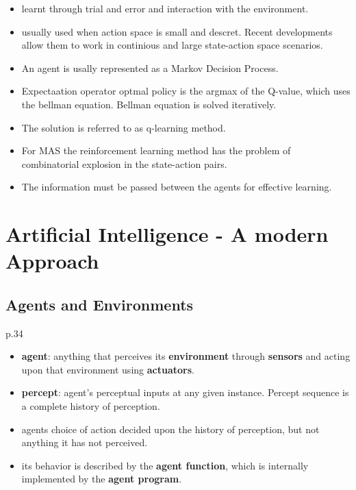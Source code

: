 \begin{itemize}
\begin{itemize}[noitemsep,nolistsep]
		\item learnt through trial and error and interaction with the environment.
		\item usually used when action space is small and descret. Recent developments allow them to work in continious and large state-action space scenarios.
		\item An agent is usally represented as a Markov Decision Process.
		\item Expectaation operator optmal policy is the argmax of the Q-value, which uses the bellman equation. Bellman equation is solved iteratively.
		\item The solution is referred to as q-learning method.
		\item For MAS the reinforcement learning method has the problem of combinatorial explosion in the state-action pairs.
		\item The information must be passed between the agents for effective learning.
	\end{itemize}
\end{itemize}

\section{Artificial Intelligence - A modern Approach}
\subsection{Agents and Environments}
p.34
\begin{itemize}[noitemsep,nolistsep]
	\item \textbf{agent}: anything that perceives its \textbf{environment} through \textbf{sensors} and acting upon that environment using \textbf{actuators}.
	\item \textbf{percept}: agent’s perceptual inputs at any given instance. Percept sequence is a complete history of perception.
	\item agents choice of action decided upon the history of perception, but not anything it has not perceived.
	\item its behavior is described by the \textbf{agent function}, which is internally implemented by the \textbf{agent program}.
\end{itemize}

